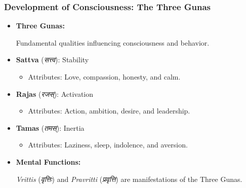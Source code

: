 \begin{frame}[fragile]\frametitle{Development of Consciousness: The Three Gunas}

      \begin{itemize}
        \item \textbf{Three Gunas:}
        
        Fundamental qualities influencing consciousness and behavior.
        
        \item \textbf{Sattva} (\textit{सत्त्व}): Stability
        \begin{itemize}
            \item Attributes: Love, compassion, honesty, and calm.
        \end{itemize}
        \item \textbf{Rajas} (\textit{रजस्}): Activation
        \begin{itemize}
            \item Attributes: Action, ambition, desire, and leadership.
        \end{itemize}
        \item \textbf{Tamas} (\textit{तमस्}): Inertia
        \begin{itemize}
            \item Attributes: Laziness, sleep, indolence, and aversion.
        \end{itemize}
        \item \textbf{Mental Functions:}
        
        \textit{Vrittis} (\textit{वृत्तिः}) and \textit{Pravritti} (\textit{प्रवृत्ति}) are manifestations of the Three Gunas.
        
      \end{itemize}

\end{frame}

